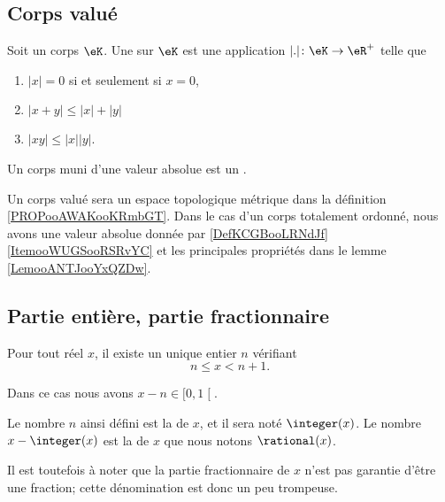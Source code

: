\subsection{Corps valué}

\begin{definition}       \label{DEFooBWXXooAkBBRS}
	Soit un corps \( \eK\). Une  sur \(\eK\) est une application \( | . |\colon \eK\to \eR^+\) telle que
	\begin{enumerate}
		\item
		      \( | x |=0\) si et seulement si \( x=0\),
		\item
		      \( | x+y |\leq | x |+| y |\)
		\item
		      \( | xy |\leq | x | | y |\).
	\end{enumerate}
	Un corps muni d'une valeur absolue est un .
\end{definition}
Un corps valué sera un espace topologique métrique dans la définition \ref{PROPooAWAKooKRmbGT}. Dans le cas d'un corps totalement ordonné, nous avons une valeur absolue donnée par \ref{DefKCGBooLRNdJf}\ref{ItemooWUGSooRSRvYC} et les principales propriétés dans le lemme \ref{LemooANTJooYxQZDw}.

\subsection{Partie entière, partie fractionnaire}

\begin{lemmaDef}      \label{LEMooLEXTooGAQxGB}
	Pour tout réel \( x\), il existe un unique entier \( n\) vérifiant
	\begin{equation}
		n\leq x<n+1.
	\end{equation}

	Dans ce cas nous avons \( x-n\in\mathopen[ 0 , 1 \mathclose[\).

	Le nombre \( n\) ainsi défini est la  de \( x\), et il sera noté \( \integer(x)\). Le nombre \( x-\integer(x)\) est la  de \( x\) que nous notons \( \rational(x)\).

	Il est toutefois à noter que la partie fractionnaire de \( x\) n'est pas garantie d'être une fraction; cette dénomination est donc un peu trompeuse.
\end{lemmaDef}

